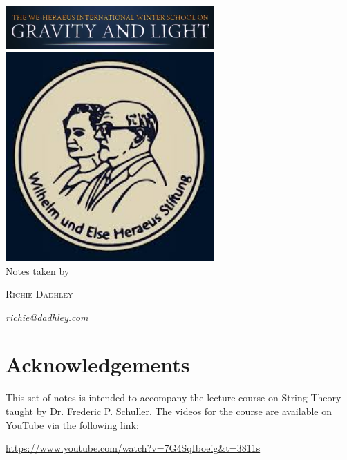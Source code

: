 \documentclass[11pt,oneside]{book}
\theoremstyle{definition} %
\theoremstyle{plain} %
\theoremstyle{remark} %
\theoremstyle{underline}
\begin{document}
\begin{titlepage}
	   
	    \includegraphics[width=8cm]{images/WinterSchool.png}
	    \includegraphics[width=8cm]{images/WinterSchoolEmblem.jpg}\\[1cm] %

	    Notes taken by 
	
	    \vspace{0.5\baselineskip} %
	
	    {\scshape\Large Richie Dadhley} %
	   
	    \vspace{0.5\baselineskip} %
	    \textit{richie@dadhley.com} %
	
	    \vfill %
\end{titlepage}




\newpage
\section*{Acknowledgements}

This set of notes is intended to accompany the lecture course on String Theory taught by Dr. Frederic P. Schuller. The videos for the course are available on YouTube via the following link:

\begin{center}
    \href{https://www.youtube.com/watch?v=7G4SqIboeig&t=3811s}{https://www.youtube.com/watch?v=7G4SqIboeig\&t=3811s}
\end{center}
\end{document}
